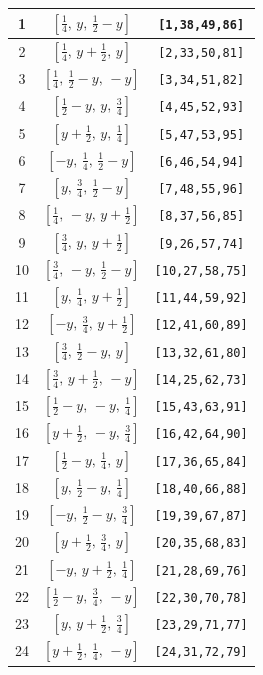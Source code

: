 \documentclass[fleqn,8pt]{jsarticle}
\begin{document}
\begin{longtable}{ccc}
1 & $\left[ \frac{1}{4},\, y,\, \frac{1}{2} - y \right]$ & {\tt [1,38,49,86]} \\ \hline
2 & $\left[ \frac{1}{4},\, y + \frac{1}{2},\, y \right]$ & {\tt [2,33,50,81]} \\ \hline
3 & $\left[ \frac{1}{4},\, \frac{1}{2} - y,\, - y \right]$ & {\tt [3,34,51,82]} \\ \hline
4 & $\left[ \frac{1}{2} - y,\, y,\, \frac{3}{4} \right]$ & {\tt [4,45,52,93]} \\ \hline
5 & $\left[ y + \frac{1}{2},\, y,\, \frac{1}{4} \right]$ & {\tt [5,47,53,95]} \\ \hline
6 & $\left[ - y,\, \frac{1}{4},\, \frac{1}{2} - y \right]$ & {\tt [6,46,54,94]} \\ \hline
7 & $\left[ y,\, \frac{3}{4},\, \frac{1}{2} - y \right]$ & {\tt [7,48,55,96]} \\ \hline
8 & $\left[ \frac{1}{4},\, - y,\, y + \frac{1}{2} \right]$ & {\tt [8,37,56,85]} \\ \hline
9 & $\left[ \frac{3}{4},\, y,\, y + \frac{1}{2} \right]$ & {\tt [9,26,57,74]} \\ \hline
10 & $\left[ \frac{3}{4},\, - y,\, \frac{1}{2} - y \right]$ & {\tt [10,27,58,75]} \\ \hline
11 & $\left[ y,\, \frac{1}{4},\, y + \frac{1}{2} \right]$ & {\tt [11,44,59,92]} \\ \hline
12 & $\left[ - y,\, \frac{3}{4},\, y + \frac{1}{2} \right]$ & {\tt [12,41,60,89]} \\ \hline
13 & $\left[ \frac{3}{4},\, \frac{1}{2} - y,\, y \right]$ & {\tt [13,32,61,80]} \\ \hline
14 & $\left[ \frac{3}{4},\, y + \frac{1}{2},\, - y \right]$ & {\tt [14,25,62,73]} \\ \hline
15 & $\left[ \frac{1}{2} - y,\, - y,\, \frac{1}{4} \right]$ & {\tt [15,43,63,91]} \\ \hline
16 & $\left[ y + \frac{1}{2},\, - y,\, \frac{3}{4} \right]$ & {\tt [16,42,64,90]} \\ \hline
17 & $\left[ \frac{1}{2} - y,\, \frac{1}{4},\, y \right]$ & {\tt [17,36,65,84]} \\ \hline
18 & $\left[ y,\, \frac{1}{2} - y,\, \frac{1}{4} \right]$ & {\tt [18,40,66,88]} \\ \hline
19 & $\left[ - y,\, \frac{1}{2} - y,\, \frac{3}{4} \right]$ & {\tt [19,39,67,87]} \\ \hline
20 & $\left[ y + \frac{1}{2},\, \frac{3}{4},\, y \right]$ & {\tt [20,35,68,83]} \\ \hline
21 & $\left[ - y,\, y + \frac{1}{2},\, \frac{1}{4} \right]$ & {\tt [21,28,69,76]} \\ \hline
22 & $\left[ \frac{1}{2} - y,\, \frac{3}{4},\, - y \right]$ & {\tt [22,30,70,78]} \\ \hline
23 & $\left[ y,\, y + \frac{1}{2},\, \frac{3}{4} \right]$ & {\tt [23,29,71,77]} \\ \hline
24 & $\left[ y + \frac{1}{2},\, \frac{1}{4},\, - y \right]$ & {\tt [24,31,72,79]} \\
\end{longtable}
\end{document}

